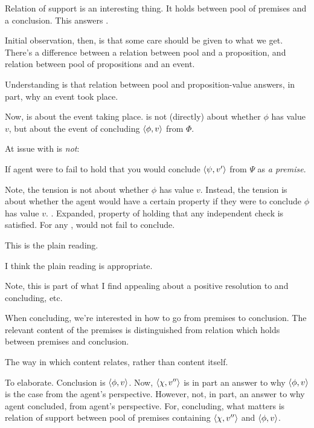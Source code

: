 \begin{note}
  Relation of support is an interesting thing.
  It holds between pool of premises and a conclusion.
  This answers \qWhy{}.

  Initial observation, then, is that some care should be given to what we get.
  There's a difference between a relation between pool and a proposition, and relation between pool of propositions and an event.

  Understanding is that relation between pool and proposition-value answers, in part, why an event took place.
\end{note}

\begin{note}
  Now, \qzS{} is about the event taking place.
  \qzS{} is not (directly) about whether \(\phi\) has value \(v\), but about the event of concluding \(\langle \phi, v \rangle\) from \(\Phi\).
\end{note}

\begin{note}
  At issue with \qzS{} is \emph{not}:

  If agent were to fail to hold that you would conclude \(\langle \psi, v' \rangle\) from \(\Psi\) as \emph{a premise}.
\end{note}

\begin{note}
  Note, the tension is not about whether \(\phi\) has value \(v\).
  Instead, the tension is about whether the agent would have a certain property if they were to conclude \(\phi\) has value \(v\).
  \zS{}.
  Expanded, property of holding that any independent check is satisfied.
  For any \requ{}, would not fail to conclude.
\end{note}

\begin{note}
  This is the plain reading.

  I think the plain reading is appropriate.
\end{note}

\begin{note}[Aside]
  Note, this is part of what I find appealing about a positive resolution to \issueConstraint{} and concluding, etc.

  When concluding, we're interested in how to go from premises to conclusion.
  The relevant content of the premises is distinguished from relation which holds between premises and conclusion.

  The way in which content relates, rather than content itself.

  To elaborate.
  Conclusion is \(\langle \phi, v \rangle\).
  Now, \(\langle \chi, v'' \rangle\) is in part an answer to why \(\langle \phi, v \rangle\) is the case from the agent's perspective.
  However, not, in part, an answer to why agent concluded, from agent's perspective.
  For, concluding, what matters is relation of support between pool of premises containing \(\langle \chi, v'' \rangle\) and \(\langle \phi, v \rangle\).
\end{note}

